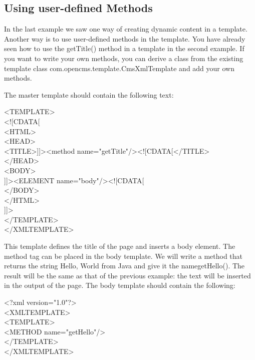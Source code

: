 \subsection{Using user-defined Methods}
In the last example we saw one way of creating dynamic content in a
template. Another way is to use user-defined methods in the template.
You have already seen how to use the {\meth getTitle(}) method in a template in
the second example. If you want to write your own methods, you can
derive a class from the existing template class
{\class com.opencms.template.CmsXmlTemplate} and add your own methods.

The master template should contain the following text:

\begin{xml}
<TEMPLATE>\\
\xtaba  <![CDATA[\\
\xtaba  <HTML>\\
\xtabb    <HEAD>\\
\xtabb    <TITLE>]]><method name="getTitle"/><![CDATA[</TITLE>\\
\xtabb    </HEAD>\\
\xtabb    <BODY>\\
\xtabb    ]]><ELEMENT name="body"/><![CDATA[\\
\xtabb    </BODY>\\
\xtaba  </HTML>\\
\xtaba  ]]>\\
</TEMPLATE>\\
</XMLTEMPLATE>\\
\end{xml}

This template defines the title of the page and inserts a body element.
The method tag can be placed in the body template. We will write a
method that returns the string {\name Hello, World from Java} and give it the
name{\meth getHello(}). The result will be the same as that of the previous
example: the text will be inserted in the output of the page. The body
template should contain the following:

\begin{xml}
<?xml version="1.0"?>\\
<XMLTEMPLATE>\\
<TEMPLATE>\\
<METHOD name="getHello"/>\\
</TEMPLATE>\\
</XMLTEMPLATE>\\
\end{xml}

